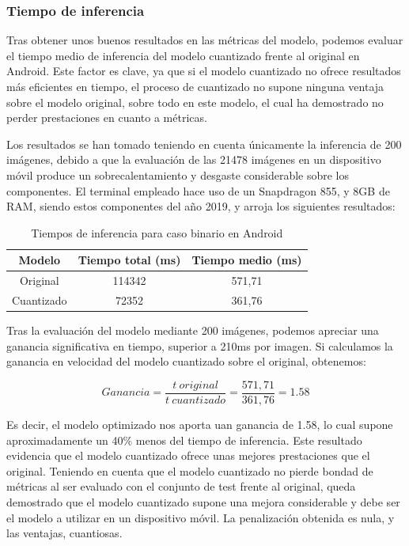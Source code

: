 \subsubsection{Tiempo de inferencia}

Tras obtener unos buenos resultados en las métricas del modelo, podemos evaluar el tiempo medio de inferencia del modelo cuantizado frente al original en Android. Este factor es clave, ya que si el modelo cuantizado no ofrece resultados más eficientes en tiempo, el proceso de cuantizado no supone ninguna ventaja sobre el modelo original, sobre todo en este modelo, el cual ha demostrado no perder prestaciones en cuanto a métricas.

Los resultados se han tomado teniendo en cuenta únicamente la inferencia de 200 imágenes, debido a que la evaluación de las 21478 imágenes en un dispositivo móvil produce un sobrecalentamiento y desgaste considerable sobre los componentes. El terminal empleado hace uso de un Snapdragon 855, y 8GB de RAM, siendo estos componentes del año 2019, y arroja los siguientes resultados:

\begin{table}[H]
	\centering
	\begin{tabular}{|c|c|c|}
		\hline
		Modelo & Tiempo total (ms) & Tiempo medio (ms) \\ \hline
		Original & 114342 & 571,71 \\ \hline
		Cuantizado & 72352 & 361,76 \\ \hline
	\end{tabular}
	\caption{Tiempos de inferencia para caso binario en Android}
	\label{infbin}
\end{table}

Tras la evaluación del modelo mediante 200 imágenes, podemos apreciar una ganancia significativa en tiempo, superior a 210ms por imagen. Si calculamos la ganancia en velocidad del modelo cuantizado sobre el original, obtenemos:

$$Ganancia = \frac{t\ original}{t\ cuantizado} = \frac{571,71}{361,76} = 1.58$$

Es decir, el modelo optimizado nos aporta uan ganancia de 1.58, lo cual supone aproximadamente un 40\% menos del tiempo de inferencia. Este resultado evidencia que el modelo cuantizado ofrece unas mejores prestaciones que el original. Teniendo en cuenta que el modelo cuantizado no pierde bondad de métricas al ser evaluado con el conjunto de test frente al original, queda demostrado que el modelo cuantizado supone una mejora considerable y debe ser el modelo a utilizar en un dispositivo móvil. La penalización obtenida es nula, y las ventajas, cuantiosas.

